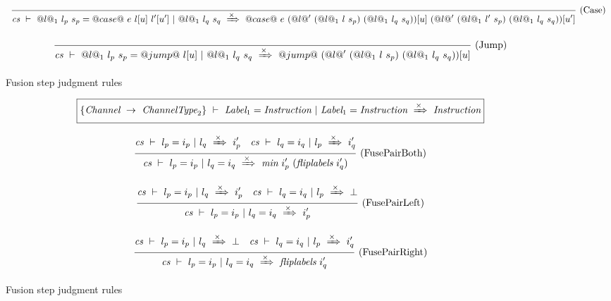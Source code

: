 \begin{figure}
$$
$$

$$
\ruleAx{
  \FuseStep{\cs}{\LabelOneC{l_p}{s_p}}{@case@~e~l[u]~l'[u']}{\LabelOneC{l_q}{s_q}}
    {@case@~e~
      \LabelCrossOnesC{l}{s_p}{l_q}{s_q}{u}
      ~
      \LabelCrossOnesC{l'}{s_p}{l_q}{s_q}{u'}
      }
}{Case}
$$

$$
\ruleAx{
  \FuseStep{\cs}{\LabelOneC{l_p}{s_p}}{@jump@~l[u]}{\LabelOneC{l_q}{s_q}}
    {@jump@~
      \LabelCrossOnesC{l}{s_p}{l_q}{s_q}{u}
      }
}{Jump}
$$


\caption{Fusion step judgment rules}
\label{fig:Fusion:Def:Step}
\end{figure}

\begin{figure}


$$
\boxed{\FuseStepPair{\ChanTypeMap}{\Label_1}{\Instr}{\Label_1}{\Instr}{\Instr}}
$$

$$
\ruleIN{
  \FuseStep{\cs}{l_p}{i_p}{l_q}{i_p'}
  \quad
  \FuseStep{\cs}{l_q}{i_q}{l_p}{i_q'}
}{
  \FuseStepPair{\cs}{l_p}{i_p}{l_q}{i_q}{\ti{min}~i_p'~(\ti{fliplabels}~i_q')}
}{FusePairBoth}
$$

$$
\ruleIN{
  \FuseStep{\cs}{l_p}{i_p}{l_q}{i_p'}
  \quad
  \notFuseStep{\cs}{l_q}{i_q}{l_p}{i_q'}
}{
  \FuseStepPair{\cs}{l_p}{i_p}{l_q}{i_q}{i_p'}
}{FusePairLeft}
$$


$$
\ruleIN{
  \notFuseStep{\cs}{l_p}{i_p}{l_q}{i_p'}
  \quad
  \FuseStep{\cs}{l_q}{i_q}{l_p}{i_q'}
}{
  \FuseStepPair{\cs}{l_p}{i_p}{l_q}{i_q}{\ti{fliplabels}~i_q'}
}{FusePairRight}
$$

\caption{Fusion step judgment rules}
\label{fig:Fusion:Def:StepPair}
\end{figure}
